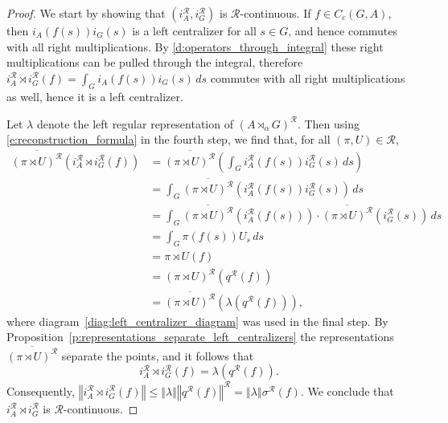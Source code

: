 \documentclass{amsart}
\theoremstyle{plain}
\theoremstyle{definition}
\numberwithin{equation}{section}
\begin{document}
\begin{proof}
We start by showing that $(i_A^{\mathcal R}, i_G^{\mathcal R})$ is ${\mathcal R}$-continuous. If $f\in C_c(G,A)$, then $i_A(f(s)) i_G(s)$ is a left centralizer for all $s \in G$, and hence commutes with all right multiplications. By \eqref{d:operators_through_integral} these right multiplications can be pulled through the integral, therefore $i_A^{\mathcal R} {\rtimes} i_G^{\mathcal R}(f) = \int_G i_A(f(s)) i_G(s) {\,ds}$ commutes with all right multiplications as well, hence it is a left centralizer.

Let $\lambda$ denote the left regular representation of ${(A {\rtimes}_\alpha G)^\mathcal{R}}$. Then using \eqref{e:reconstruction_formula} in the fourth step, we find that, for all ${(\pi,U)}\in{\mathcal R}$,
\begin{align*}
\overline{({\pi \rtimes U})^{\mathcal R}}\left(i_A^{\mathcal R}{\rtimes} i_G^{\mathcal R} (f)\right)&=
 \overline{({\pi \rtimes U})^{\mathcal R}}{\left( {\int_G i_A^{\mathcal R}(f(s))i_G^{\mathcal R}(s)\,ds} \right)}\\ &= \int_G \overline{({\pi \rtimes U})^{\mathcal R}}(i_A^{\mathcal R}(f(s))i_G^{\mathcal R}(s))\,ds \\
&= \int_G \overline{({\pi \rtimes U})^{\mathcal R}}(i_A^{\mathcal R}(f(s)))\cdot\overline{({\pi \rtimes U})^{\mathcal R}}(i_G^{\mathcal R}(s)) \,ds \\
&= \int_G \pi(f(s))U_s \,ds \\
&= {\pi \rtimes U}(f)\\
&=({\pi \rtimes U})^{\mathcal R}({q^{\mathcal R}}(f))\\
&= \overline{({\pi \rtimes U})^{\mathcal R}}(\lambda({q^{\mathcal R}}(f))),
\end{align*}
where diagram~\eqref{diag:left_centralizer_diagram} was used in the final step. By Proposition~\ref{p:representations_separate_left_centralizers} the representations $\overline{({\pi \rtimes U})^{\mathcal R}}$ separate the points, and it follows that
\[
i_A^{\mathcal R}{\rtimes} i_G^{\mathcal R} (f)=\lambda({q^{\mathcal R}}(f)).
\]
Consequently, ${\left\Vert {i_A^{\mathcal R}{\rtimes} i_G^{\mathcal R} (f)} \right\Vert}\leq{\left\Vert {\lambda} \right\Vert}{\left\Vert {{q^{\mathcal R}}(f)} \right\Vert^{\mathcal R}}={\left\Vert {\lambda} \right\Vert}{\sigma^{\mathcal R}}(f)$. We conclude that $i_A^{\mathcal R}{\rtimes} i_G^{\mathcal R}$ is ${\mathcal R}$-continuous.


\end{proof}
\end{document}
